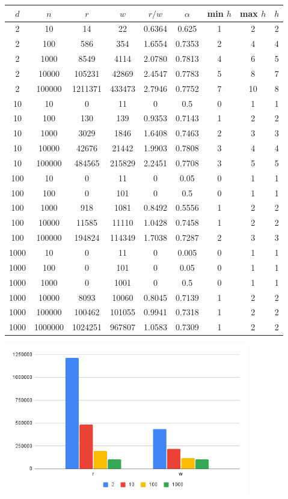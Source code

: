 \documentclass{article}
\begin{document}
\begin{center}
\begin{tabular}{|c|c|c c c| c |c c c|}
\hline
$d$ & $n$ & $r$ & $w$ & $r/w$ & $\alpha$ & min $h$ & max $h$ & $h$ \\
\hline
2 & 10 & 14 & 22 & 0.6364 & 0.625 & 1 & 2 & 2 \\
2 & 100 & 586 & 354 & 1.6554 & 0.7353 & 2 & 4 & 4 \\
2 & 1000 & 8549 & 4114 & 2.0780 & 0.7813 & 4 & 6 & 5 \\
2 & 10000 & 105231 & 42869 & 2.4547 & 0.7783 & 5 & 8 & 7 \\
2 & 100000 & 1211371 & 433473 & 2.7946 & 0.7752 & 7 & 10 & 8 \\
\hline
10 & 10 & 0 & 11 & 0 & 0.5 & 0 & 1 & 1 \\
10 & 100 & 130 & 139 & 0.9353 & 0.7143 & 1 & 2 & 2 \\
10 & 1000 & 3029 & 1846 & 1.6408 & 0.7463 & 2 & 3 & 3 \\
10 & 10000 & 42676 & 21442 & 1.9903 & 0.7808 & 3 & 4 & 4 \\
10 & 100000 & 484565 & 215829 & 2.2451 & 0.7708 & 3 & 5 & 5 \\
\hline
100 & 10 & 0 & 11 & 0 & 0.05 & 0 & 1 & 1 \\
100 & 100 & 0 & 101 & 0 & 0.5 & 0 & 1 & 1 \\
100 & 1000 & 918 & 1081 & 0.8492 & 0.5556 & 1 & 2 & 2 \\
100 & 10000 & 11585 & 11110 & 1.0428 & 0.7458 & 1 & 2 & 2 \\
100 & 100000 & 194824 & 114349 & 1.7038 & 0.7287 & 2 & 3 & 3 \\
\hline
1000 & 10 & 0 & 11 & 0 & 0.005 & 0 & 1 & 1 \\
1000 & 100 & 0 & 101 & 0 & 0.05 & 0 & 1 & 1 \\
1000 & 1000 & 0 & 1001 & 0 & 0.5 & 0 & 1 & 1 \\
1000 & 10000 & 8093 & 10060 & 0.8045 & 0.7139 & 1 & 2 & 2 \\
1000 & 100000 & 100462 & 101055 & 0.9941 & 0.7318 & 1 & 2 & 2 \\
1000 & 1000000 & 1024251 & 967807 & 1.0583 & 0.7309 & 1 & 2 & 2 \\
\hline
\end{tabular}

\begin{center}
    \includegraphics[width=0.8\textwidth]{images/chart.png}
    

\end{center}
\end{center}
\end{document}

